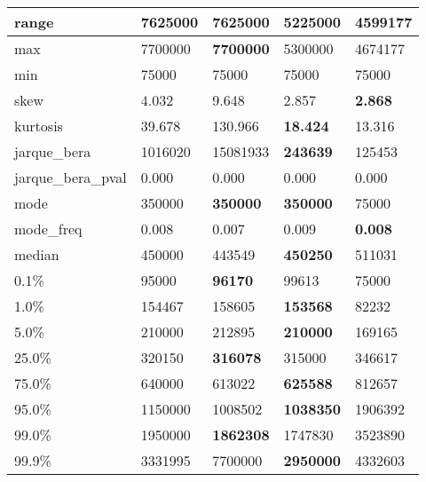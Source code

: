 \begin{table}[H]
\begin{tabular}{|l|m{10em}|m{10em}|m{10em}|m{10em}|}
\hline range & 7625000 & \bfseries 7625000 & 5225000 & \cellcolor[rgb]{0.9, 0.54, 0.52} 4599177 \\
\hline max & 7700000 & \bfseries 7700000 & 5300000 & \cellcolor[rgb]{0.9, 0.54, 0.52} 4674177 \\
\hline min & 75000 & 75000 & 75000 & 75000 \\
\hline skew & 4.032 & \cellcolor[rgb]{0.9, 0.54, 0.52} 9.648 & 2.857 & \bfseries 2.868 \\
\hline kurtosis & 39.678 & \cellcolor[rgb]{0.9, 0.54, 0.52} 130.966 & \bfseries 18.424 & 13.316 \\
\hline jarque\_bera & 1016020 & \cellcolor[rgb]{0.9, 0.54, 0.52} 15081933 & \bfseries 243639 & 125453 \\
\hline jarque\_bera\_pval & 0.000 & 0.000 & 0.000 & 0.000 \\
\hline mode & 350000 & \bfseries 350000 & \bfseries 350000 & \cellcolor[rgb]{0.9, 0.54, 0.52} 75000 \\
\hline mode\_freq & 0.008 & \cellcolor[rgb]{0.9, 0.54, 0.52} 0.007 & 0.009 & \bfseries 0.008 \\
\hline median & 450000 & 443549 & \bfseries 450250 & \cellcolor[rgb]{0.9, 0.54, 0.52} 511031 \\
\hline 0.1\% & 95000 & \bfseries 96170 & 99613 & \cellcolor[rgb]{0.9, 0.54, 0.52} 75000 \\
\hline 1.0\% & 154467 & 158605 & \bfseries 153568 & \cellcolor[rgb]{0.9, 0.54, 0.52} 82232 \\
\hline 5.0\% & 210000 & 212895 & \bfseries 210000 & \cellcolor[rgb]{0.9, 0.54, 0.52} 169165 \\
\hline 25.0\% & 320150 & \bfseries 316078 & 315000 & \cellcolor[rgb]{0.9, 0.54, 0.52} 346617 \\
\hline 75.0\% & 640000 & 613022 & \bfseries 625588 & \cellcolor[rgb]{0.9, 0.54, 0.52} 812657 \\
\hline 95.0\% & 1150000 & 1008502 & \bfseries 1038350 & \cellcolor[rgb]{0.9, 0.54, 0.52} 1906392 \\
\hline 99.0\% & 1950000 & \bfseries 1862308 & 1747830 & \cellcolor[rgb]{0.9, 0.54, 0.52} 3523890 \\
\hline 99.9\% & 3331995 & \cellcolor[rgb]{0.9, 0.54, 0.52} 7700000 & \bfseries 2950000 & 4332603 \\
\hline
\end{tabular}
\end{table}
